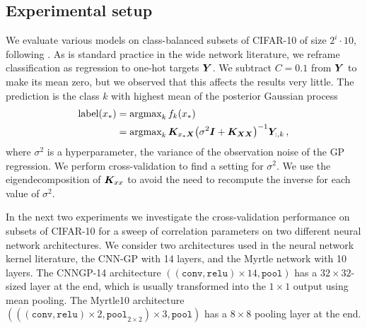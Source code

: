 \documentclass[accepted]{uai2021} %
\newcommand{\0}{\boldsymbol{0}}
\newcommand{\1}{\boldsymbol{1}}
\begin{document}


\subsection{Experimental setup}
We evaluate various models on class-balanced subsets of CIFAR-10 of size $2^i \cdot 10$, following \citet{arora2020small}. As is
standard practice in the wide network literature, we reframe classification as
regression to one-hot targets ${\bm{Y}}$. %
We subtract $C=0.1$ from ${\bm{Y}}$ to make its mean zero, but we observed that this affects the results very little. The prediction is the class $k$ with highest mean of the posterior Gaussian process
\begin{align}
\text{label}(x_*) &= \text{argmax}_k \,f_k(x_*) \nonumber \\
&= \text{argmax}_k \,{\bm{K}}_{x_* {\bm{X}}}{\left( \sigma^2{{\bm{I}}} + {\bm{K}}_{{\bm{X}}{\bm{X}}} \right)}^{-1}{\bm{Y}}_{:,k}\,,
\label{eq:mean-gp}
\end{align}
where $\sigma^2$ is a hyperparameter, the variance of the observation noise of the GP regression. We perform cross-validation to find a setting for $\sigma^2$. We use the eigendecomposition of ${\bm{K}}_{xx}$ to avoid the need to recompute the inverse for each value of $\sigma^2$.

In the next two experiments we investigate the cross-validation performance on subsets of CIFAR-10 for a sweep of correlation parameters on two different neural network architectures.
We consider two architectures used in the neural network kernel literature, the CNN-GP \citep{novak2019infiniteconv,arora2019exact} with 14 layers, and the Myrtle network \citep{shankar2020without} with 10 layers. The CNNGP-14 architecture $((\texttt{conv}, \texttt{relu})\times 14, \texttt{pool})$ has a $32 \times 32$-sized layer at the end, which is usually transformed into the $1 \times 1$ output using mean pooling. The Myrtle10 architecture $(((\texttt{conv},\texttt{relu})\times 2, \texttt{pool}_{2\times 2}) \times 3, \texttt{pool})$ has a $8\times 8$ pooling layer at the end.
\end{document}
